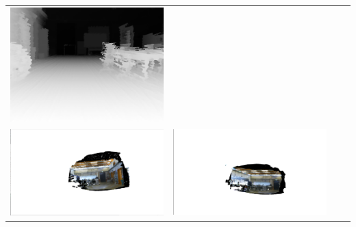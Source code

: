 \documentclass[english, bachelor, utf8]{base/thesis_telematics}
\begin{document}
\begin{table}[h]
\begin{tabular}{
  >{\centering\arraybackslash}m{}
  >{\centering\arraybackslash}m{}
  >{\centering\arraybackslash}m{}
  >{\centering\arraybackslash}m{}
}
    \includegraphics[width=\linewidth]{pics/robo/robo_4/depth0016.png} \\
    \includegraphics[width=\linewidth]{pics/robo/robo_1/Screenshot from 2025-09-14 18-24-59.png} &
    \includegraphics[width=\linewidth]{pics/robo/robo_2/Screenshot from 2025-09-14 18-25-32.png} &

\end{tabular}
\end{table}
\end{document}
